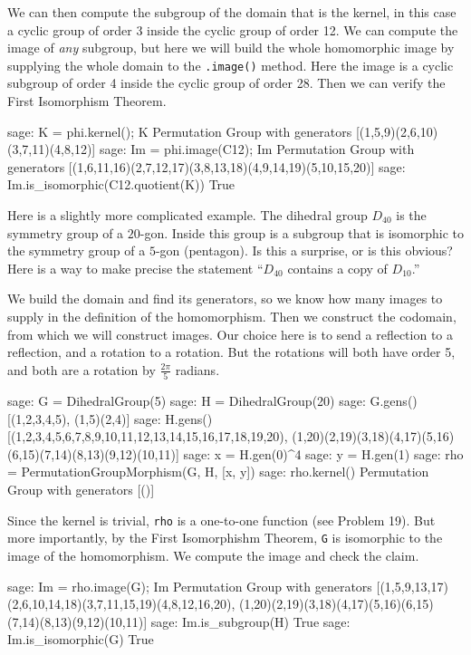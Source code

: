 %
We can then compute the subgroup of the domain that is the kernel, in this case a cyclic group of order 3 inside the cyclic group of order 12.  We can compute the image of \emph{any} subgroup, but here we will build the whole homomorphic image by supplying the whole domain to the \verb?.image()? method.  Here the image is a cyclic subgroup of order 4 inside the cyclic group of order 28.  Then we can verify the First Isomorphism Theorem.
%
\begin{sageexample}
sage: K = phi.kernel(); K
Permutation Group with generators [(1,5,9)(2,6,10)(3,7,11)(4,8,12)]
sage: Im = phi.image(C12); Im
Permutation Group with generators
[(1,6,11,16)(2,7,12,17)(3,8,13,18)(4,9,14,19)(5,10,15,20)]
sage: Im.is_isomorphic(C12.quotient(K))
True
\end{sageexample}
%
Here is a slightly more complicated example.  The dihedral group $D_{40}$ is the symmetry group of a $20$-gon.  Inside this group is a subgroup that is isomorphic to the symmetry group of a $5$-gon (pentagon).  Is this a surprise, or is this obvious?  Here is a way to make precise the statement ``$D_{40}$ contains a copy of $D_{10}$.''\par
%
We build the domain and find its generators, so we know how many images to supply in the definition of the homomorphism.  Then we construct the codomain, from which we will construct images.  Our choice here is to send a reflection to a reflection, and a rotation to a rotation.  But the rotations will both have order 5, and both are a rotation by $\frac{2\pi}{5}$ radians.
%
\begin{sageexample}
sage: G = DihedralGroup(5)
sage: H = DihedralGroup(20)
sage: G.gens()
[(1,2,3,4,5), (1,5)(2,4)]
sage: H.gens()
[(1,2,3,4,5,6,7,8,9,10,11,12,13,14,15,16,17,18,19,20),
 (1,20)(2,19)(3,18)(4,17)(5,16)(6,15)(7,14)(8,13)(9,12)(10,11)]
sage: x = H.gen(0)^4
sage: y = H.gen(1)
sage: rho = PermutationGroupMorphism(G, H, [x, y])
sage: rho.kernel()
Permutation Group with generators [()]
\end{sageexample}
%
Since the kernel is trivial, \verb?rho? is a one-to-one function (see Problem 19).  But more importantly, by the First Isomorphishm Theorem, \verb?G? is isomorphic to the image of the homomorphism.  We compute the image and check the claim.
%
\begin{sageexample}
sage: Im = rho.image(G); Im
Permutation Group with generators
[(1,5,9,13,17)(2,6,10,14,18)(3,7,11,15,19)(4,8,12,16,20),
 (1,20)(2,19)(3,18)(4,17)(5,16)(6,15)(7,14)(8,13)(9,12)(10,11)]
sage: Im.is_subgroup(H)
True
sage: Im.is_isomorphic(G)
True
\end{sageexample}
